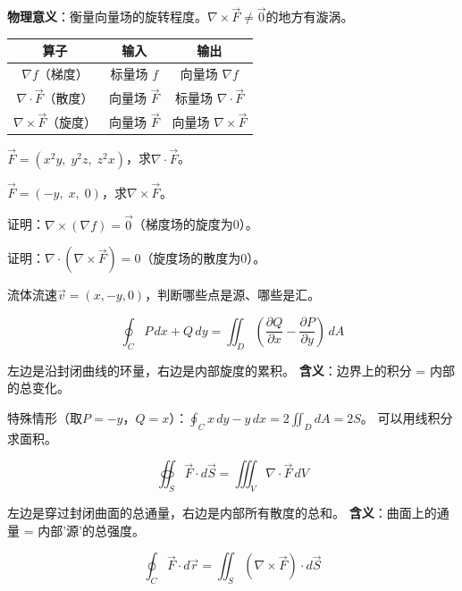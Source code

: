 \documentclass[a4paper,12pt]{ctexart}
\begin{document}
\textbf{物理意义}：衡量向量场的旋转程度。$\nabla\times\vec F\neq\vec0$的地方有漩涡。

\begin{center}
\begin{tabular}{c|c|c}
算子 & 输入 & 输出\\ \hline
$\nabla f$（梯度） & 标量场 $f$ & 向量场 $\nabla f$\\
$\nabla\cdot\vec F$（散度） & 向量场 $\vec F$ & 标量场 $\nabla\cdot\vec F$\\
$\nabla\times\vec F$（旋度） & 向量场 $\vec F$ & 向量场 $\nabla\times\vec F$
\end{tabular}
\end{center}


\begin{exercise}
\item $\vec F=(x^2y,\;y^2z,\;z^2x)$，求$\nabla\cdot\vec F$。
\item $\vec F=(-y,\;x,\;0)$，求$\nabla\times\vec F$。
\item 证明：$\nabla\times(\nabla f)=\vec0$（梯度场的旋度为0）。
\item 证明：$\nabla\cdot(\nabla\times\vec F)=0$（旋度场的散度为0）。
\item 流体流速$\vec v=(x,-y,0)$，判断哪些点是源、哪些是汇。
\end{exercise}

\newpage



\[
\oint_C P\,dx+Q\,dy = \iint_D \left(\frac{\partial Q}{\partial x} - \frac{\partial P}{\partial y}\right)\,dA
\]

左边是沿封闭曲线的环量，右边是内部旋度的累积。
\textbf{含义}：边界上的积分 = 内部的总变化。

特殊情形（取$P=-y$，$Q=x$）：$\oint_C x\,dy-y\,dx = 2\iint_D dA = 2S$。
可以用线积分求面积。


\[
\oiint_S \vec F\cdot d\vec S = \iiint_V \nabla\cdot\vec F\,dV
\]

左边是穿过封闭曲面的总通量，右边是内部所有散度的总和。
\textbf{含义}：曲面上的通量 = 内部'源'的总强度。


\[
\oint_C \vec F\cdot d\vec r = \iint_S (\nabla\times\vec F)\cdot d\vec S
\]
\end{document}
